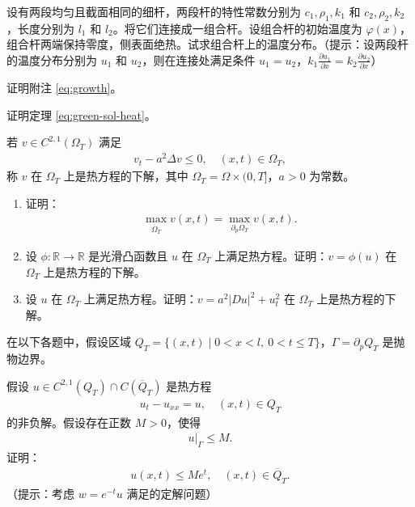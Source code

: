 \documentclass[../../main.tex]{subfiles}%
\begin{document}
\begin{example}
设有两段均匀且截面相同的细杆，两段杆的特性常数分别为 $c_1,\rho_1,k_1$ 和 $c_2,\rho_2,k_2$，长度分别为 $l_1$ 和 $l_2$。将它们连接成一组合杆。设组合杆的初始温度为 $\varphi(x)$，组合杆两端保持零度，侧表面绝热。试求组合杆上的温度分布。（提示：设两段杆的温度分布分别为 $u_1$ 和 $u_2$，则在连接处满足条件 $u_1=u_2$，$k_1\frac{\partial u_1}{\partial x}=k_2\frac{\partial u_2}{\partial x}$）
\end{example}

\begin{example}
证明附注 \eqref{eq:growth}。
\end{example}

\begin{example}
证明定理 \eqref{eq:green-sol-heat}。
\end{example}

\begin{example}
若 $v\in C^{2,1}(\Omega_T)$ 满足
\begin{align*}
v_t-a^2\Delta v\leqslant 0,\quad (x,t)\in\Omega_T,
\end{align*}
称 $v$ 在 $\Omega_T$ 上是热方程的下解，其中 $\Omega_T=\Omega\times(0,T]$，$a>0$ 为常数。
\begin{enumerate}[(1)]
\item 证明：
\begin{align*}
\max_{\overline{\Omega}_T}v(x,t)=\max_{\partial_p\Omega_T}v(x,t).
\end{align*}
\item 设 $\phi:\mathbb{R}\to\mathbb{R}$ 是光滑凸函数且 $u$ 在 $\Omega_T$ 上满足热方程。证明：$v=\phi(u)$ 在 $\Omega_T$ 上是热方程的下解。
\item 设 $u$ 在 $\Omega_T$ 上满足热方程。证明：$v=a^2|Du|^2+u_t^2$ 在 $\Omega_T$ 上是热方程的下解。
\end{enumerate}
\end{example}

在以下各题中，假设区域 $Q_T=\{(x,t)\mid 0<x<l,\ 0<t\leqslant T\}$，$\Gamma=\partial_p Q_T$ 是抛物边界。

\begin{example}
假设 $u\in C^{2,1}(Q_T)\cap C(\overline{Q}_T)$ 是热方程
\begin{align*}
u_t-u_{xx}=u,\quad (x,t)\in Q_T
\end{align*}
的非负解。假设存在正数 $M>0$，使得
\begin{align*}
u|_\Gamma\leqslant M.
\end{align*}
证明：
\begin{align*}
u(x,t)\leqslant Me^t,\quad (x,t)\in\overline{Q}_T.
\end{align*}
（提示：考虑 $w=e^{-t}u$ 满足的定解问题）
\end{example}
\end{document}
